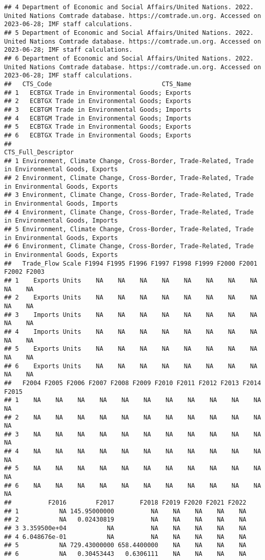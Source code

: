 \documentclass[
]{article}
\begin{document}
\begin{verbatim}
## 4 Department of Economic and Social Affairs/United Nations. 2022. United Nations Comtrade database. https://comtrade.un.org. Accessed on 2023-06-28; IMF staff calculations.
## 5 Department of Economic and Social Affairs/United Nations. 2022. United Nations Comtrade database. https://comtrade.un.org. Accessed on 2023-06-28; IMF staff calculations.
## 6 Department of Economic and Social Affairs/United Nations. 2022. United Nations Comtrade database. https://comtrade.un.org. Accessed on 2023-06-28; IMF staff calculations.
##   CTS_Code                              CTS_Name
## 1   ECBTGX Trade in Environmental Goods; Exports
## 2   ECBTGX Trade in Environmental Goods; Exports
## 3   ECBTGM Trade in Environmental Goods; Imports
## 4   ECBTGM Trade in Environmental Goods; Imports
## 5   ECBTGX Trade in Environmental Goods; Exports
## 6   ECBTGX Trade in Environmental Goods; Exports
##                                                                               CTS_Full_Descriptor
## 1 Environment, Climate Change, Cross-Border, Trade-Related, Trade in Environmental Goods, Exports
## 2 Environment, Climate Change, Cross-Border, Trade-Related, Trade in Environmental Goods, Exports
## 3 Environment, Climate Change, Cross-Border, Trade-Related, Trade in Environmental Goods, Imports
## 4 Environment, Climate Change, Cross-Border, Trade-Related, Trade in Environmental Goods, Imports
## 5 Environment, Climate Change, Cross-Border, Trade-Related, Trade in Environmental Goods, Exports
## 6 Environment, Climate Change, Cross-Border, Trade-Related, Trade in Environmental Goods, Exports
##   Trade_Flow Scale F1994 F1995 F1996 F1997 F1998 F1999 F2000 F2001 F2002 F2003
## 1    Exports Units    NA    NA    NA    NA    NA    NA    NA    NA    NA    NA
## 2    Exports Units    NA    NA    NA    NA    NA    NA    NA    NA    NA    NA
## 3    Imports Units    NA    NA    NA    NA    NA    NA    NA    NA    NA    NA
## 4    Imports Units    NA    NA    NA    NA    NA    NA    NA    NA    NA    NA
## 5    Exports Units    NA    NA    NA    NA    NA    NA    NA    NA    NA    NA
## 6    Exports Units    NA    NA    NA    NA    NA    NA    NA    NA    NA    NA
##   F2004 F2005 F2006 F2007 F2008 F2009 F2010 F2011 F2012 F2013 F2014 F2015
## 1    NA    NA    NA    NA    NA    NA    NA    NA    NA    NA    NA    NA
## 2    NA    NA    NA    NA    NA    NA    NA    NA    NA    NA    NA    NA
## 3    NA    NA    NA    NA    NA    NA    NA    NA    NA    NA    NA    NA
## 4    NA    NA    NA    NA    NA    NA    NA    NA    NA    NA    NA    NA
## 5    NA    NA    NA    NA    NA    NA    NA    NA    NA    NA    NA    NA
## 6    NA    NA    NA    NA    NA    NA    NA    NA    NA    NA    NA    NA
##          F2016        F2017       F2018 F2019 F2020 F2021 F2022
## 1           NA 145.95000000          NA    NA    NA    NA    NA
## 2           NA   0.02430819          NA    NA    NA    NA    NA
## 3 3.359500e+04           NA          NA    NA    NA    NA    NA
## 4 6.048676e-01           NA          NA    NA    NA    NA    NA
## 5           NA 729.43000000 658.4400000    NA    NA    NA    NA
## 6           NA   0.30453443   0.6306111    NA    NA    NA    NA
\end{verbatim}
\end{document}
